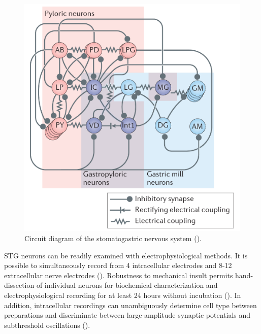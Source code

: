 \documentclass[14pt]{article}
\begin{document}
	\begin{figure}
		\centering
		\includegraphics[width=0.5\textheight]{NusbaumMarder2017}
		\caption{Circuit diagram of the stomatogastric nervous system (\cite{NusbaumFunctionalconsequencesneuropeptide2017}).}
	\end{figure}

	STG neurons can be readily examined with electrophysiological methods. It is possible to simultaneously record from 4 intracellular electrodes and 8-12 extracellular nerve electrodes (\cite{MarderPrinciplesrhythmicmotor1996}). Robustness to mechanical insult permits hand-dissection of individual neurons for biochemical characterization and electrophysiological recording for at least 24 hours without incubation (\cite{MarderUnderstandingCircuitDynamics2007,MizrahiLongTermMaintenanceChannel2001}). In addition, intracellular recordings can unambiguously determine cell type between preparations and discriminate between large-amplitude synaptic potentials and subthreshold oscillations (\cite{MarderUnderstandingCircuitDynamics2007,MarderPrinciplesrhythmicmotor1996}).
	
\end{document}

